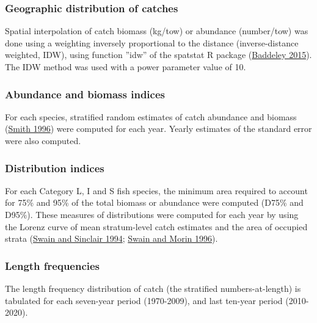 \documentclass[12pt]{article}\usepackage[]{graphicx}\usepackage[]{color}
\begin{document}
\hypertarget{geographic-distribution-of-catches}{%
\subsubsection{Geographic distribution of catches}\label{geographic-distribution-of-catches}}

Spatial interpolation of catch biomass (kg/tow) or abundance (number/tow) was done using a weighting inversely proportional to the distance (inverse-distance weighted, IDW), using function ''idw'' of the spatstat R package (\protect\hyperlink{ref-R:package:spatstat}{Baddeley 2015}). The IDW method was used with a power parameter value of 10.

\hypertarget{abundance-and-biomass-indices}{%
\subsubsection{Abundance and biomass indices}\label{abundance-and-biomass-indices}}

For each species, stratified random estimates of catch abundance and biomass (\protect\hyperlink{ref-Smith:1996}{Smith 1996}) were computed for each year. Yearly estimates of the standard error were also computed.

\hypertarget{distribution-indices}{%
\subsubsection{Distribution indices}\label{distribution-indices}}

For each Category L, I and S fish species, the minimum area required to account for 75\% and 95\% of the total biomass or abundance were computed (D75\% and D95\%). These measures of distributions were computed for each year by using the Lorenz curve of mean stratum-level catch estimates and the area of occupied strata (\protect\hyperlink{ref-Swain:Sinclair:1994:cjfas}{Swain and Sinclair 1994}; \protect\hyperlink{ref-Swain:Morin:1996:cjfas}{Swain and Morin 1996}).

\hypertarget{length-frequencies}{%
\subsubsection{Length frequencies}\label{length-frequencies}}

The length frequency distribution of catch (the stratified numbers-at-length) is tabulated for each seven-year period (1970-2009), and last ten-year period (2010-2020).
\end{document}
